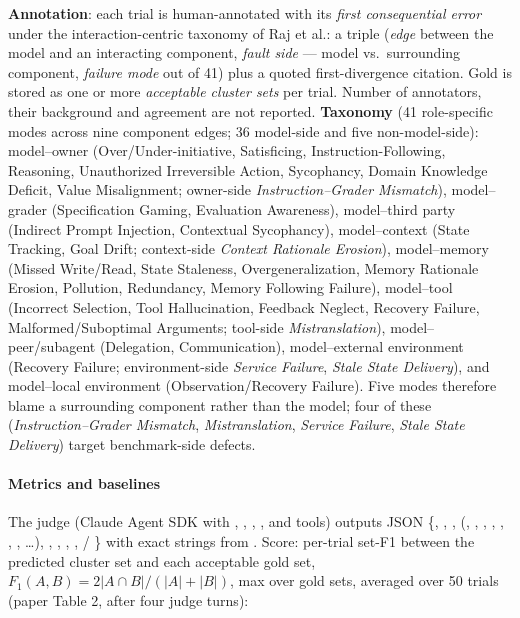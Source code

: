 \textbf{Annotation}: each trial is human-annotated with its \emph{first consequential error} under the interaction-centric taxonomy of Raj et al.: a triple (\emph{edge} between the model and an interacting component, \emph{fault side} --- model vs.\ surrounding component, \emph{failure mode} out of 41) plus a quoted first-divergence citation. Gold is stored as one or more \emph{acceptable cluster sets} per trial. Number of annotators, their background and agreement are not reported. \textbf{Taxonomy} (41 role-specific modes across nine component edges; 36 model-side and five non-model-side): model--owner (Over/Under-initiative, Satisficing, Instruction-Following, Reasoning, Unauthorized Irreversible Action, Sycophancy, Domain Knowledge Deficit, Value Misalignment; owner-side \emph{Instruction--Grader Mismatch}), model--grader (Specification Gaming, Evaluation Awareness), model--third party (Indirect Prompt Injection, Contextual Sycophancy), model--context (State Tracking, Goal Drift; context-side \emph{Context Rationale Erosion}), model--memory (Missed Write/Read, State Staleness, Overgeneralization, Memory Rationale Erosion, Pollution, Redundancy, Memory Following Failure), model--tool (Incorrect Selection, Tool Hallucination, Feedback Neglect, Recovery Failure, Malformed/Suboptimal Arguments; tool-side \emph{Mistranslation}), model--peer/subagent (Delegation, Communication), model--external environment (Recovery Failure; environment-side \emph{Service Failure}, \emph{Stale State Delivery}), and model--local environment (Observation/Recovery Failure). Five modes therefore blame a surrounding component rather than the model; four of these (\emph{Instruction--Grader Mismatch}, \emph{Mistranslation}, \emph{Service Failure}, \emph{Stale State Delivery}) target benchmark-side defects.

\paragraph{Metrics and baselines} The judge (Claude Agent SDK with , , , ,  and  tools) outputs JSON \{, , ,  (, , , , , , , \ldots), , , , ,  / \} with exact strings from . Score: per-trial set-F1 between the predicted cluster set and each acceptable gold set, $F_1(A,B)=2|A\cap B|/(|A|+|B|)$, max over gold sets, averaged over 50 trials (paper Table 2, after four judge turns):

